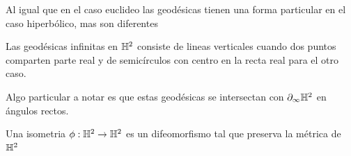     Al igual que en el caso euclideo las geodésicas tienen una forma particular en el caso hiperbólico, mas son diferentes

    \begin{theorem}
        Las geodésicas infinitas en $\mathbb{H}^2$ consiste de lineas verticales cuando dos puntos comparten parte real y de semicírculos con centro en la recta real para el otro caso.
    \end{theorem}

    Algo particular a notar es que estas geodésicas se intersectan con $\partial_\infty\mathbb{H}^2$ en ángulos rectos.\\

    \begin{definition}
        Una isometria $\phi:\mathbb{H}^2\to\mathbb{H}^2$ es un difeomorfismo tal que preserva la métrica de $\mathbb{H}^2$
    \end{definition}

